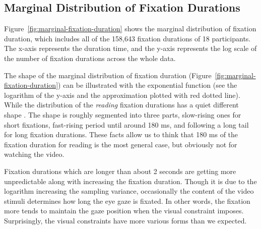 \documentclass[10pt,letterpaper]{article}
\begin{document}
\subsection{Marginal Distribution of Fixation Durations}

Figure~\ref{fig:marginal-fixation-duration} shows the marginal distribution of fixation duration, which includes all of the 158,643 fixation durations of 18 participants. The x-axis represents the duration time, and the y-axis represents the log scale of the number of fixation durations across the whole data.

The shape of the marginal distribution of fixation duration (Figure~\ref{fig:marginal-fixation-duration}) can be illustrated with the exponential function (see the logarithm of the y-axis and the approximation plotted with red dotted line). While the distribution of the \textit{reading} fixation durations has a quiet different shape \cite{Feng2006}. The shape is roughly segmented into three parts, slow-rising ones for short fixations, fast-rising period until around 180 ms, and following a long tail for long fixation durations. These facts allow us to think that 180 ms of the fixation duration for reading is the most general case, but obviously not for watching the video.

Fixation durations which are longer than about 2 seconds are getting more unpredictable along with increasing the fixation duration. Though it is due to the logarithm increasing the sampling variance, occasionally the content of the video stimuli determines how long the eye gaze is fixated. In other words, the fixation more tends to maintain the gaze position when the visual constraint imposes. Surprisingly, the visual constraints have more various forms than we expected.
\end{document}
